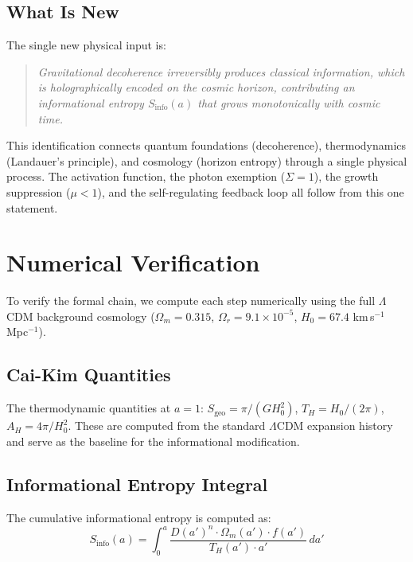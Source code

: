 \documentclass[aps,prd,twocolumn,superscriptaddress,nofootinbib]{revtex4-2}
\begin{document}
\subsection{What Is New}

The single new physical input is:
\begin{quote}
\textit{Gravitational decoherence irreversibly produces classical information, which is holographically encoded on the cosmic horizon, contributing an informational entropy $S_\text{info}(a)$ that grows monotonically with cosmic time.}
\end{quote}

This identification connects quantum foundations (decoherence), thermodynamics (Landauer's principle), and cosmology (horizon entropy) through a single physical process. The activation function, the photon exemption ($\Sigma = 1$), the growth suppression ($\mu < 1$), and the self-regulating feedback loop all follow from this one statement.

\section{Numerical Verification}
\label{sec:numerical}

To verify the formal chain, we compute each step numerically using the full $\Lambda$CDM background cosmology ($\Omega_m = 0.315$, $\Omega_r = 9.1 \times 10^{-5}$, $H_0 = 67.4$ km\,s$^{-1}$\,Mpc$^{-1}$).

\subsection{Cai-Kim Quantities}

The thermodynamic quantities at $a = 1$: $S_\text{geo} = \pi/(GH_0^2)$, $T_H = H_0/(2\pi)$, $A_H = 4\pi/H_0^2$. These are computed from the standard $\Lambda$CDM expansion history and serve as the baseline for the informational modification.

\subsection{Informational Entropy Integral}

The cumulative informational entropy is computed as:
\begin{equation}
S_\text{info}(a) = \int_0^a \frac{D(a')^n \cdot \Omega_m(a') \cdot f(a')}{T_H(a') \cdot a'}\,da'
\end{equation}
\end{document}
